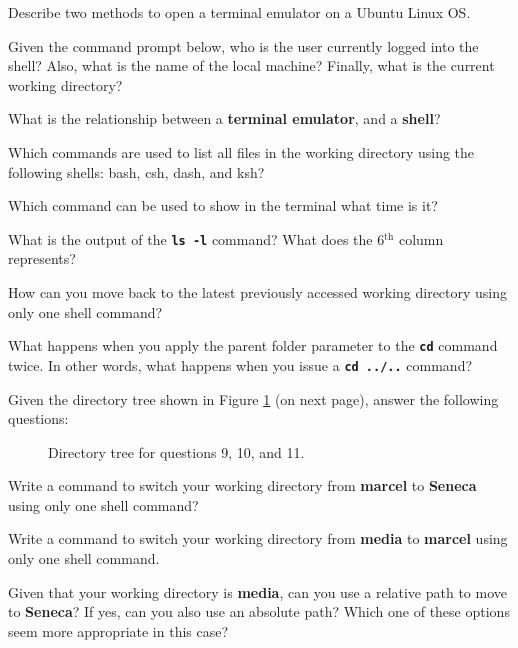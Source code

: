 \begin{exercises}
   \item Describe two methods to open a terminal emulator on a Ubuntu Linux OS.
   \item Given the command prompt below, who is the user currently logged into the shell? Also, what is the name of the local machine? Finally, what is the current working directory?
   \item What is the relationship between a \textbf{terminal emulator}, and a \textbf{shell}?
   \item Which commands are used to list all files in the working directory using the following shells: bash, csh, dash, and ksh?
   \item Which command can be used to show in the terminal what time is it?
   \item What is the output of the \textbf{\texttt{ls -l}} command? What does the 6$^{}$ column represents?
   \item How can you move back to the latest previously accessed working directory using only one shell command?
   \item What happens when you apply the parent folder parameter to the \textbf{\texttt{cd}} command twice. In other words, what happens when you issue a \textbf{\texttt{cd ../..}} command?

Given the directory tree shown in Figure \ref{fig:ch2_ex_dirtree} (on next page), answer the following questions:
\begin{figure}[!htbp]
  \centering
        
        \caption{Directory tree for questions 9, 10, and 11.}
        \label{fig:ch2_ex_dirtree}
\end{figure}
   \item Write a command to switch your working directory from \textbf{marcel} to \textbf{Seneca} using only one shell command?
   \item Write a command to switch your working directory from \textbf{media} to \textbf{marcel} using only one shell command.
   \item Given that your working directory is \textbf{media}, can you use a relative path to move to \textbf{Seneca}? If yes, can you also use an absolute path? Which one of these options seem more appropriate in this case?
\end{exercises}
